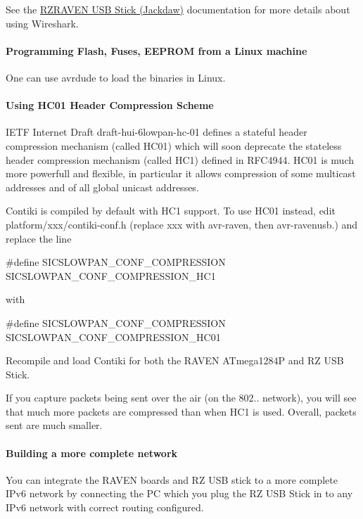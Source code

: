 See the \hyperlink{a00067}{R\+Z\+R\+A\+V\+EN U\+SB Stick (Jackdaw)} documentation for more details about using Wireshark.\hypertarget{a00072_adavanced_linux}{}\paragraph{Programming Flash, Fuses, E\+E\+P\+R\+O\+M from a Linux machine}\label{a00072_adavanced_linux}
One can use avrdude to load the binaries in Linux.\hypertarget{a00072_advanced_hc01}{}\paragraph{Using H\+C01 Header Compression Scheme}\label{a00072_advanced_hc01}
I\+E\+TF Internet Draft draft-\/hui-\/6lowpan-\/hc-\/01 defines a stateful header compression mechanism (called H\+C01) which will soon deprecate the stateless header compression mechanism (called H\+C1) defined in R\+F\+C4944. H\+C01 is much more powerfull and flexible, in particular it allows compression of some multicast addresses and of all global unicast addresses.

Contiki is compiled by default with H\+C1 support. To use H\+C01 instead, edit platform/xxx/contiki-\/conf.\+h (replace xxx with avr-\/raven, then avr-\/ravenusb.) and replace the line~\newline
 
\begin{DoxyCode}
\textcolor{preprocessor}{#define SICSLOWPAN\_CONF\_COMPRESSION SICSLOWPAN\_CONF\_COMPRESSION\_HC1}
\end{DoxyCode}
 with 
\begin{DoxyCode}
\textcolor{preprocessor}{#define SICSLOWPAN\_CONF\_COMPRESSION SICSLOWPAN\_CONF\_COMPRESSION\_HC01}
\end{DoxyCode}


Recompile and load Contiki for both the R\+A\+V\+EN A\+Tmega1284P and RZ U\+SB Stick.

If you capture packets being sent over the air (on the 802.. network), you will see that much more packets are compressed than when H\+C1 is used. Overall, packets sent are much smaller.\hypertarget{a00072_advanced_network}{}\paragraph{Building a more complete network}\label{a00072_advanced_network}
You can integrate the R\+A\+V\+EN boards and RZ U\+SB stick to a more complete I\+Pv6 network by connecting the PC which you plug the RZ U\+SB Stick in to any I\+Pv6 network with correct routing configured.

